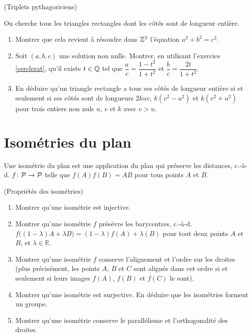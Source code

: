 \documentclass[a4paper,11pt,reqno]{amsart}
\begin{document}
\begin{exo} (Triplets pythagoriciens)

  On cherche tous les triangles rectangles dont les côtés sont de longueur entière.
  \begin{enumerate}
    \item Montrer que cela revient à résoudre dans $\mathbb{Z}^3$ l'équation $a^2+b^2=c^2$.
    \item Soit $(a,b,c)$ une solution non nulle. Montrer, en utilisant l'exercice \ref{cerclerat}, qu'il  existe $t \in \mathbb{Q}$ tel que $\dfrac{a}{c}= \dfrac{1-t^2}{1+t^2}$\; et\; $\dfrac{b}{c}= \dfrac{2t}{1+t^2}$.
    \item En déduire qu'un triangle rectangle a tous ses côtés de longueur entière si et seulement si ses côtés sont de longueurs $2kuv$, $k(v^2-u^2)$ et $k(v^2+u^2)$ pour trois entiers non nuls $u$, $v$ et $k$ avec $v>u$.
  \end{enumerate}
\end{exo}


\section{Isométries du plan}

\begin{convention}
  Une isométrie du plan est une application du plan qui préserve les distances, c.-à-d. $f \colon \mathcal{P} \to \mathcal{P}$ telle que $f(A)f(B)=AB$ pour tous points $A$ et $B$.
\end{convention}

\begin{exo} (Propriétés des isométries)

\begin{enumerate}
  \item Montrer qu'une isométrie est injective.
  \item Montrer qu'une isométrie $f$ présèvre les barycentres, c.-à-d. $f\big((1- \lambda )A + \lambda B\big) = (1- \lambda )f(A) + \lambda (B)$ pour tout deux points $A$ et $B$, et $\lambda \in \mathbb{R}$.
   \item Montrer qu'une isométrie $f$ conserve l'alignement et l'ordre sur les droites (plus précisément, les points $A$, $B$ et $C$ sont alignés dans cet ordre si et seulement si leurs images $f(A)$, $f(B)$ et $f(C)$ le sont).
  \item Montrer qu'une isométrie est surjective. En déduire que les isométries forment un groupe.
  \item Montrer qu'une isométrie conserve le parallélisme et l'orthogonalité des droites.
\end{enumerate}
\end{exo}
\end{document}
